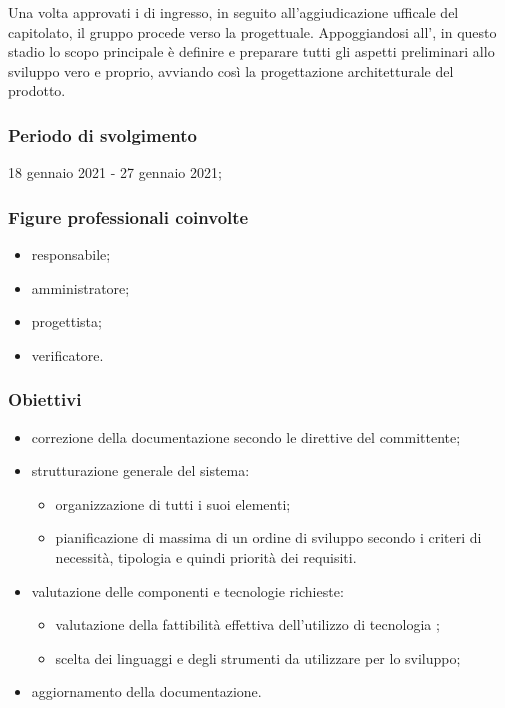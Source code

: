 Una volta approvati i  di ingresso, in seguito all'aggiudicazione ufficale del capitolato, il gruppo procede verso la  progettuale. Appoggiandosi all'\AdR{}, in questo stadio lo scopo principale è definire e preparare tutti gli aspetti preliminari allo sviluppo vero e proprio, avviando così la progettazione architetturale del prodotto.
        
        \subsubsection{Periodo di svolgimento}
        18 gennaio 2021 - 27 gennaio 2021;
        
        \subsubsection{Figure professionali coinvolte}
            \begin{itemize}
                \item responsabile;
                \item amministratore;
                \item progettista;
                \item verificatore.
            \end{itemize}

        \subsubsection{Obiettivi}
        \begin{itemize}
            \item correzione della documentazione secondo le direttive del committente;
            \item strutturazione generale del sistema:
            \begin{itemize}
                \item organizzazione di tutti i suoi elementi;
                \item pianificazione di massima di un ordine di sviluppo secondo i criteri di necessità, tipologia e quindi priorità dei requisiti.
            \end{itemize}
            \item valutazione delle componenti e tecnologie richieste:
            \begin{itemize}
                \item valutazione della fattibilità effettiva dell'utilizzo di tecnologia ;
                \item scelta dei linguaggi e degli strumenti da utilizzare per lo sviluppo;
            \end{itemize}
            \item aggiornamento della documentazione.
            
        \end{itemize}
